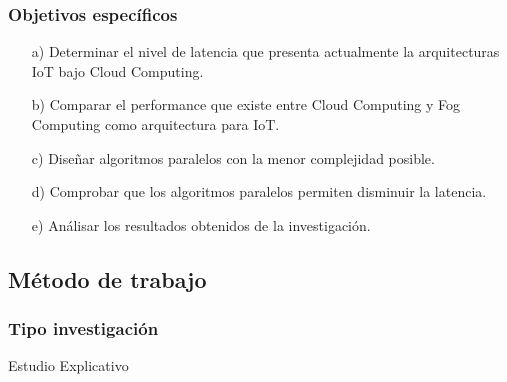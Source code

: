         \subsubsection{Objetivos específicos}
            \begin{enumerate}
                \item[a)] Determinar el nivel de latencia que presenta actualmente la arquitecturas IoT bajo Cloud Computing.
                \item[b)] Comparar el performance que existe entre Cloud Computing y Fog Computing como arquitectura para IoT. 
                \item[c)] Diseñar algoritmos  paralelos con la menor complejidad posible.
                \item[d)] Comprobar que los algoritmos paralelos permiten disminuir la latencia.
                \item[e)] Análisar los resultados obtenidos de la investigación.
            \end{enumerate}
    \subsection{Método de trabajo}    
            \subsubsection{Tipo investigación}
                Estudio Explicativo
